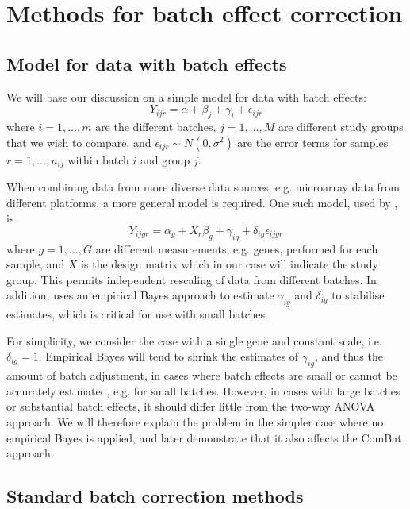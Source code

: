 \documentclass{bio}
\begin{document}
\section{Methods for batch effect correction}

\subsection{Model for data with batch effects}

We will base our discussion on a simple model for data with batch effects:
\begin{equation}
Y_{ijr}=\alpha+\beta_j+\gamma_i+\epsilon_{ijr}
\end{equation}
where $i=1,\ldots,m$ are the different batches, $j=1,\ldots,M$ are different study groups that we wish to compare, and $\epsilon_{ijr}\sim N(0,\sigma^2)$ are the error terms for samples $r=1,\ldots,n_{ij}$ within batch $i$ and group $j$.

When combining data from more diverse data sources, e.g. microarray data from different platforms, a more general model is required. One such model, used by \citet{Johnson2007}, is
\begin{equation}
Y_{ijgr}=\alpha_g+X_r\beta_{g}+\gamma_{ig}+\delta_{ig}\epsilon_{ijgr}
\end{equation}
where $g=1,\ldots,G$ are different measurements, e.g. genes, performed for each sample, and $X$ is the design matrix which in our case will indicate the study group. This permits independent rescaling of data from different batches. In addition, \citet{Johnson2007} uses an empirical Bayes approach to estimate $\gamma_{ig}$ and $\delta_{ig}$ to stabilise estimates, which is critical for use with small batches.

For simplicity, we consider the case with a single gene and constant scale, i.e. $\delta_{ig}=1$. Empirical Bayes will tend to shrink the estimates of  $\gamma_{ig}$, and thus the amount of batch adjustment, in cases where batch effects are small or cannot be accurately estimated, e.g. for small batches. However, in cases with large batches or substantial batch effects, it should differ little from the two-way ANOVA approach. We will therefore explain the problem in the simpler case where no empirical Bayes is applied, and later demonstrate that it also affects the ComBat approach.

\subsection{Standard batch correction methods}
\end{document}
